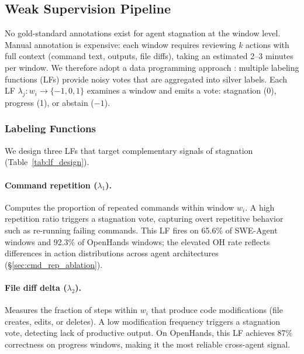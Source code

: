 \subsection{Weak Supervision Pipeline}
\label{sec:weak_supervision}

No gold-standard annotations exist for agent stagnation at the window level.
Manual annotation is expensive: each window requires reviewing $k$ actions with full context (command text, outputs, file diffs), taking an estimated 2--3 minutes per window.
We therefore adopt a data programming approach \citep{ratner2016dataprogramming,ratner2017snorkel}: multiple labeling functions (LFs) provide noisy votes that are aggregated into silver labels.
Each LF $\lambda_j : w_i \to \{-1, 0, 1\}$ examines a window and emits a vote: stagnation (0), progress (1), or abstain ($-1$).

\subsubsection{Labeling Functions}
\label{sec:labeling_functions}

We design three LFs that target complementary signals of stagnation (Table~\ref{tab:lf_design}).

\paragraph{Command repetition ($\lambda_1$).}
Computes the proportion of repeated commands within window $w_i$.
A high repetition ratio triggers a stagnation vote, capturing overt repetitive behavior such as re-running failing commands.
This LF fires on 65.6\% of SWE-Agent windows and 92.3\% of OpenHands windows; the elevated OH rate reflects differences in action distributions across agent architectures (\S\ref{sec:cmd_rep_ablation}).

\paragraph{File diff delta ($\lambda_2$).}
Measures the fraction of steps within $w_i$ that produce code modifications (file creates, edits, or deletes).
A low modification frequency triggers a stagnation vote, detecting lack of productive output.
On OpenHands, this LF achieves 87\% correctness on progress windows, making it the most reliable cross-agent signal.

